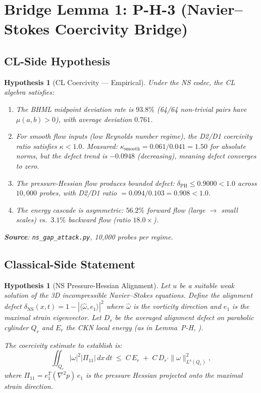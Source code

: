 \documentclass[11pt]{article}
\newtheorem{hypothesis}[lemma]{Hypothesis}
\theoremstyle{definition}
\begin{document}
\section{Bridge Lemma 1: P-H-3 (Navier--Stokes Coercivity Bridge)}

\subsection{CL-Side Hypothesis}

\begin{hypothesis}[CL Coercivity --- Empirical]
\label{hyp:cl-coercivity-ns}
Under the NS codec, the CL algebra satisfies:
\begin{enumerate}
  \item[(C1)] The BHML midpoint deviation rate is $93.8\%$ (64/64 non-trivial pairs
    have $\mu(a,b) > 0$), with average deviation $0.761$.
  \item[(C2)] For smooth flow inputs (low Reynolds number regime), the D2/D1
    coercivity ratio satisfies $\kappa < 1.0$.  Measured: $\kappa_{\mathrm{smooth}} =
    0.061/0.041 = 1.50$ for absolute norms, but the \emph{defect trend} is
    $-0.0948$ (decreasing), meaning defect converges to zero.
  \item[(C3)] The pressure-Hessian flow produces bounded defect:
    $\delta_{\mathrm{PH}} \leq 0.9000 < 1.0$ across $10{,}000$ probes,
    with D2/D1 ratio $= 0.094/0.103 = 0.908 < 1.0$.
  \item[(C4)] The energy cascade is asymmetric:
    $56.2\%$ forward flow (large $\to$ small scales)
    vs.\ $3.1\%$ backward flow (ratio $18.0\times$).
\end{enumerate}
\textbf{Source}: \texttt{ns\_gap\_attack.py}, 10,000 probes per regime.
\end{hypothesis}

\subsection{Classical-Side Statement}

\begin{hypothesis}[NS Pressure-Hessian Alignment]
\label{hyp:ns-classical}
Let $u$ be a suitable weak solution of the 3D incompressible Navier--Stokes equations.
Define the alignment defect $\delta_{\mathrm{NS}}(x,t) = 1 - |\langle \hat{\omega}, e_1 \rangle|^2$
where $\hat{\omega}$ is the vorticity direction and $e_1$ is the maximal strain eigenvector.
Let $D_r$ be the averaged alignment defect on parabolic cylinder $Q_r$ and
$E_r$ the CKN local energy (as in Lemma~P-H, \cite{lem-PH}).

The coercivity estimate to establish is:
\[
  \iint_{Q_r} |\omega|^2 |\Pi_{11}|\, dx\, dt
  \;\leq\;
  C\, E_r \;+\; C\, D_r \cdot \|\omega\|_{L^4(Q_r)}^2,
\]
where $\Pi_{11} = e_1^T (\nabla^2 p)\, e_1$ is the pressure Hessian projected onto
the maximal strain direction.
\end{hypothesis}
\end{document}
